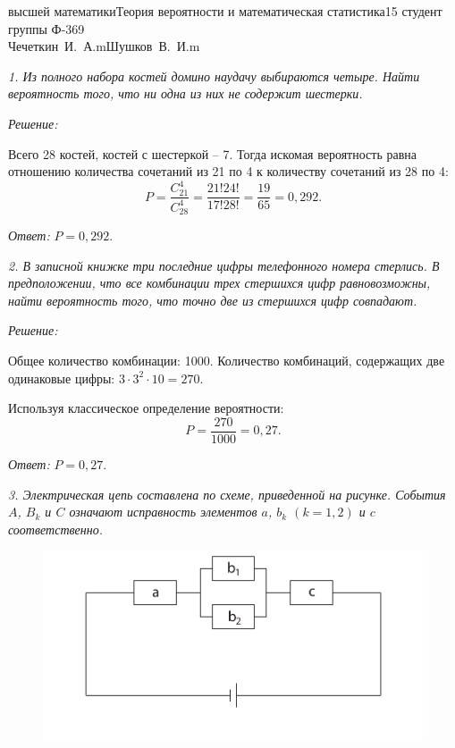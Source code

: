 



\newcommand{\ds}{\displaystyle}


{высшей математики}{Теория вероятности и математическая статистика}{}{15}
{студент группы Ф-369\\Чечеткин~И.~А.}{m}{Шушков~В.~И.}{m}

\emph{1. Из полного набора костей домино наудачу выбираются четыре. Найти вероятность
того, что ни одна из них не содержит шестерки.}

\vspace*{2em}
\emph{Решение:}

Всего 28 костей, костей с шестеркой -- 7. Тогда искомая вероятность равна
отношению количества сочетаний из 21 по 4 к количеству сочетаний из 28 по 4:
\[
    P = \frac{C_{21}^4}{C_{28}^4} = \frac{21!24!}{17!28!} = \frac{19}{65} = 0,292.
\]

\vspace*{2em}
\emph{Ответ:} \( P = 0,292 \).

\vspace*{2em}

\emph{2. В записной книжке три последние цифры телефонного номера стерлись. В
предположении, что все комбинации трех стершихся цифр равновозможны, найти
вероятность того, что точно две из стершихся цифр совпадают.}

\vspace*{2em}
\emph{Решение:}

Общее количество комбинации: 1000. Количество комбинаций, содержащих две
одинаковые цифры: \( 3\cdot 3^2 \cdot 10 = 270 \).

Используя классическое определение вероятности:
\[
    P = \frac{270}{1000} = 0,27.
\]

\vspace*{2em}
\emph{Ответ:} \( P = 0,27 \).

\pagebreak

\emph{3. Электрическая цепь составлена по схеме, приведенной на рисунке. События
\( A \), \( B_k \) и \( C \) означают исправность элементов \( a \), \( b_k \)
\( (k = 1, 2) \) и \( c \) соответственно.}

\begin{figure}[h!]
    \center
    \includegraphics[width=.5\textwidth]{15_3}
\end{figure}

